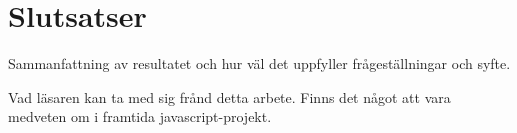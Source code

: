 \section{Slutsatser}
\label{sec:joel_a-conclusion}
Sammanfattning av resultatet och hur väl det uppfyller frågeställningar och syfte.

Vad läsaren kan ta med sig frånd detta arbete. Finns det något att vara medveten om i framtida javascript-projekt.

